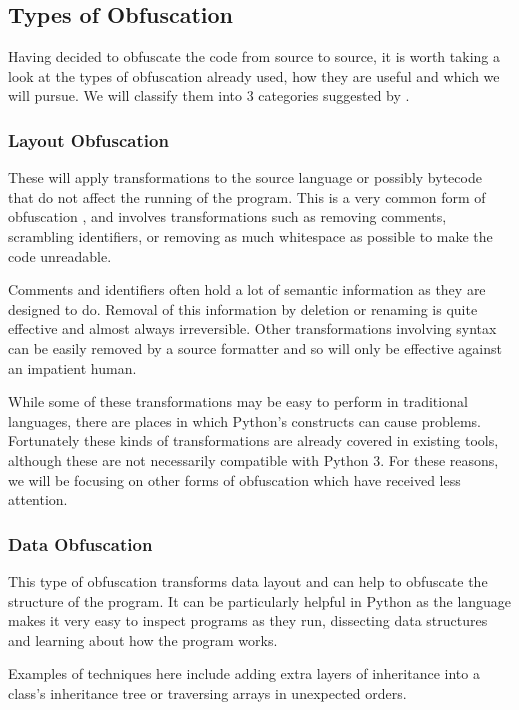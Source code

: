 \documentclass{report}
\begin{document}
\subsection{Types of Obfuscation}

Having decided to obfuscate the code from source to source, it is worth taking a look at the types of
obfuscation already used, how they are useful and which we will pursue. We will classify them into 3 categories
suggested by \cite[p10]{desevobf}.

\subsubsection{Layout Obfuscation}

These will apply transformations to the source language or possibly bytecode that do not affect the running of the
program. This is a very common form of obfuscation \cite[p10]{desevobf}, and involves transformations such as removing comments,
scrambling identifiers, or removing as much whitespace as possible to make the code unreadable.

Comments and identifiers often hold a lot of semantic information as they are designed to do.
Removal of this information by deletion or renaming is quite effective and almost always irreversible. Other transformations involving syntax
can be easily removed by a source formatter and so will only be effective against an impatient human.

While some of these transformations may be easy to perform in traditional languages, there are places in which
Python's constructs can cause problems. Fortunately these kinds of transformations are already covered in existing
tools, although these are not necessarily compatible with Python 3. For these reasons, we will be focusing on other forms of
obfuscation which have received less attention.

\subsubsection{Data Obfuscation}

This type of obfuscation transforms data layout and can help to obfuscate the structure of the program. It can be
particularly helpful in Python as the language makes it very easy to inspect programs as they run, dissecting data
structures and learning about how the program works.

Examples of techniques here include adding extra layers of inheritance into a class's inheritance tree or traversing arrays
in unexpected orders.
\end{document}
